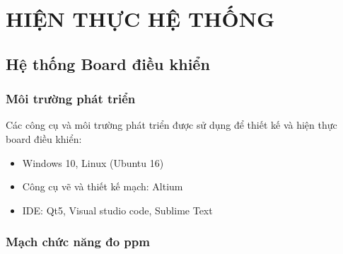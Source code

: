 \documentclass[a4paper,12pt,oneside]{article}
\begin{document}
\newpage
\section{HIỆN THỰC HỆ THỐNG}

\subsection{Hệ thống Board điều khiển}

\subsubsection{Môi trường phát triển}
Các công cụ và môi trường phát triển được sử dụng để thiết kế và hiện thực board điều khiển:
\begin{itemize}
\item Windows 10, Linux (Ubuntu 16)
\item Công cụ vẽ và thiết kế mạch: Altium
\item IDE: Qt5, Visual studio code, Sublime Text
\end{itemize}

\subsubsection{Mạch chức năng đo ppm}
\end{document}
